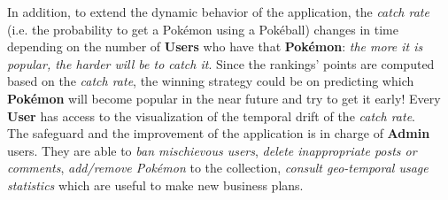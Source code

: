 In addition, to extend the dynamic behavior of the application, the \textit{catch rate} (i.e. the probability to get a Pokémon using a Pokéball) changes in time depending on the number of \textbf{Users} who have that \textbf{Pokémon}: \textit{the more it is popular, the harder will be to catch it}. Since the rankings’ points are computed based on the \textit{catch rate}, the winning strategy could be on predicting which \textbf{Pokémon} will become popular in the near future and try to get it early! Every \textbf{User} has access to the visualization of the temporal drift of the \textit{catch rate}. \medskip \\
The safeguard and the improvement of the application is in charge of \textbf{Admin} users. They are able to \textit{ban mischievous users}, \textit{delete inappropriate posts or comments}, \textit{add/remove Pokémon} to the collection, \textit{consult geo-temporal usage statistics} which are useful to make new business plans. \medskip \\
